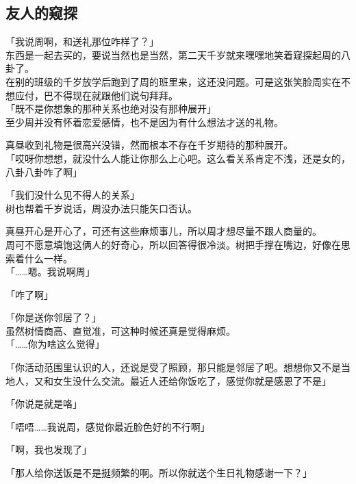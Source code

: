 \subsection{友人的窥探}

「我说周啊，和送礼那位咋样了？」\\

东西是一起去买的，要说当然也是当然，第二天千岁就来嘿嘿地笑着窥探起周的八卦了。\\

在别的班级的千岁放学后跑到了周的班里来，这还没问题。可是这张笑脸周实在不想应付，巴不得现在就跟他们说句拜拜。\\

「既不是你想象的那种关系也绝对没有那种展开」\\

至少周并没有怀着恋爱感情，也不是因为有什么想法才送的礼物。

真昼收到礼物是很高兴没错，然而根本不存在千岁期待的那种展开。\\

「哎呀你想想，就没什么人能让你那么上心吧。这么看关系肯定不浅，还是女的，八卦八卦咋了啊」

「我们没什么见不得人的关系」\\

树也帮着千岁说话，周没办法只能矢口否认。

真昼开心是开心了，可还有这些麻烦事儿，所以周才想尽量不跟人商量的。\\

周可不愿意填饱这俩人的好奇心，所以回答得很冷淡。树把手撑在嘴边，好像在思索着什么一样。\\

「……嗯。我说啊周」

「咋了啊」

「你是送你邻居了？」\\

虽然树情商高、直觉准，可这种时候还真是觉得麻烦。\\

「……你为啥这么觉得」

「你活动范围里认识的人，还说是受了照顾，那只能是邻居了吧。想想你又不是当地人，又和女生没什么交流。最近人还给你饭吃了，感觉你就是感恩了不是」

「你说是就是咯」

「唔唔……我说周，感觉你最近脸色好的不行啊」

「啊，我也发现了」

「那人给你送饭是不是挺频繁的啊。所以你就送个生日礼物感谢一下？」\\

